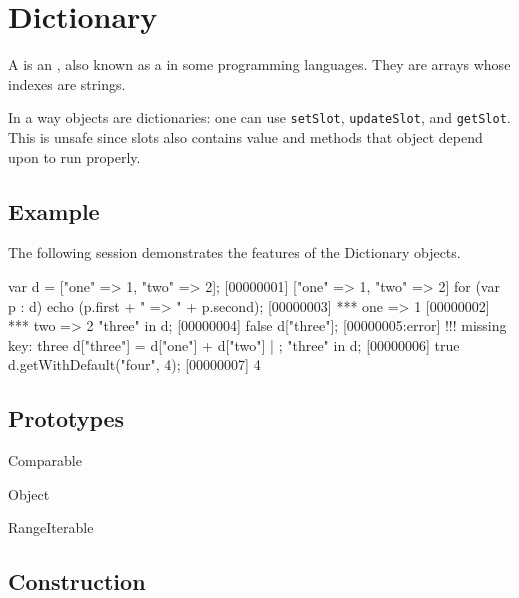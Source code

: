 
\section{Dictionary}

A  is an , also known as a
 in some programming languages.  They are arrays whose
indexes are strings.

In a way objects are dictionaries: one can use \lstinline|setSlot|,
\lstinline|updateSlot|, and \lstinline|getSlot|.  This is unsafe since
slots also contains value and methods that object depend upon to run
properly.

\subsection{Example}

The following session demonstrates the features of the Dictionary
objects.

\begin{urbiscript}[firstnumber=1]
var d = ["one" => 1, "two" => 2];
[00000001] ["one" => 1, "two" => 2]
for (var p : d)
  echo (p.first + " => " + p.second);
[00000003] *** one => 1
[00000002] *** two => 2
"three" in d;
[00000004] false
d["three"];
[00000005:error] !!! missing key: three
d["three"] = d["one"] + d["two"] | {};
"three" in d;
[00000006] true
d.getWithDefault("four", 4);
[00000007] 4
\end{urbiscript}

\subsection{Prototypes}

\begin{refObjects}
\item[Comparable]
\item[Object]
\item[RangeIterable]
\end{refObjects}

\subsection{Construction}

